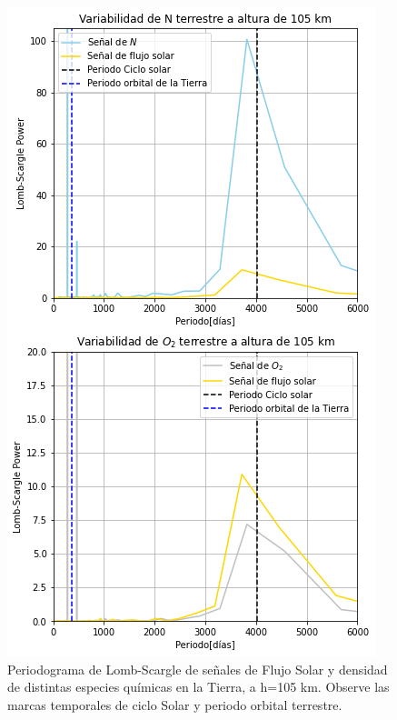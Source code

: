 \documentclass[a4paper,alpha-refs]{eSpectra}
\begin{document}
\begin{figure}[h!]
	\includegraphics[width=\columnwidth, scale=1]{Imagenes/LSP_Earth105.png}
    \caption{Periodograma de Lomb-Scargle de se\~nales de Flujo Solar y densidad de distintas especies qu\'imicas en la Tierra, a h=105 km. Observe las marcas temporales de ciclo Solar y periodo orbital terrestre.}
    \label{fig:periodogramaLSP_E105}
\end{figure}
\end{document}
